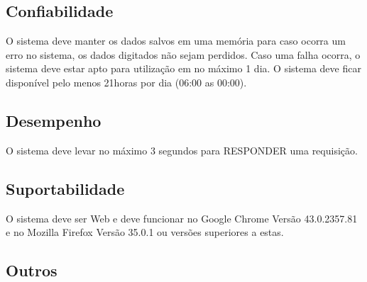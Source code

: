 \subsection{Confiabilidade}

O sistema deve manter os dados salvos em uma memória para caso ocorra um erro no sistema, os dados digitados não sejam perdidos.
Caso uma falha ocorra, o sistema deve estar apto para utilização em no máximo 1 dia.
O sistema deve ficar disponível pelo menos 21horas por dia (06:00 as 00:00).

\subsection{Desempenho}

O sistema deve levar no máximo 3 segundos para RESPONDER uma requisição.

\subsection{Suportabilidade}

O sistema deve ser Web e deve funcionar no Google Chrome Versão
43.0.2357.81 e no Mozilla Firefox Versão 35.0.1 ou versões superiores a estas.

\subsection{Outros}

